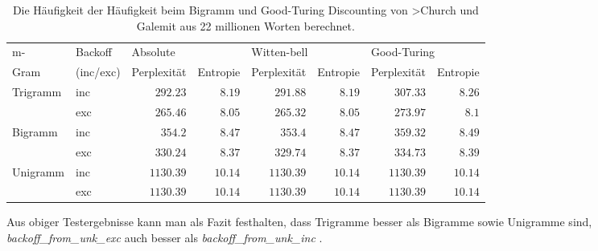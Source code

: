  
\begin{table}[h]
  \begin{center}
    \begin{tabular}{l|l||r|r|r|r|r|r}
     
     m- &Backoff &\multicolumn{2}{|l|}{Absolute}&\multicolumn{2}{|l|}{Witten-bell}&\multicolumn{2}{l}{Good-Turing}\\
	  
	  Gram&(inc/exc)&Perplexit\"at&Entropie&Perplexit\"at&Entropie&Perplexit\"at&Entropie\\
     \hline
		Trigramm &inc 	& $292.23$ 	& $8.19$ 	& $291.88$ 	& $8.19$ 	& $307.33$ 	& $8.26$\\
				 		 &exc		& $265.46$ 	& $8.05$ 	& $265.32$ 	& $8.05$ 	& $273.97$ 	& $8.1$\\
		Bigramm  &inc 	& $354.2$ 	& $8.47$ 	& $353.4$ 	& $8.47$ 	& $359.32$ 	& $8.49$\\
				 		 &exc		& $330.24$ 	& $8.37$ 	& $329.74$ 	& $8.37$ 	& $334.73$ 	& $8.39$\\
		Unigramm &inc 	& $1130.39$ & $10.14$ & $1130.39$ & $10.14$ & $1130.39$ & $10.14$\\
				 		 &exc		& $1130.39$ & $10.14$ & $1130.39$ & $10.14$ & $1130.39$ & $10.14$\\
     \hline
    \end{tabular}
  \end{center}
\caption{Die H\"aufigkeit der H\"aufigkeit beim Bigramm und Good-Turing Discounting von >Church und Galemit aus 22 millionen Worten berechnet.}
\label{tab:table_3}
\end{table} 
Aus obiger Testergebnisse kann man als Fazit festhalten, dass Trigramme besser als Bigramme sowie Unigramme sind, \emph{backoff\_from\_unk\_exc} auch besser als \emph{backoff\_from\_unk\_inc} .
 